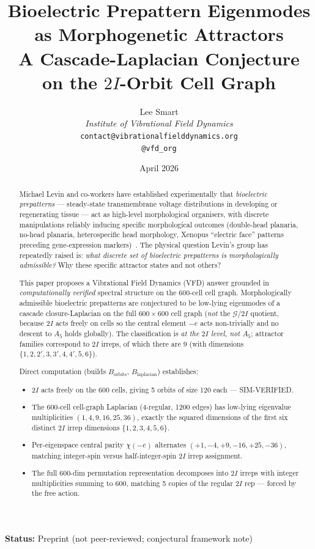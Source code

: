 \documentclass[12pt]{article}
\title{Bioelectric Prepattern Eigenmodes as Morphogenetic Attractors\\[6pt]
\large A Cascade-Laplacian Conjecture on the $2I$-Orbit Cell Graph}
\author{%
  Lee Smart\\[4pt]
  \textit{Institute of Vibrational Field Dynamics}\\[2pt]
  \texttt{contact@vibrationalfielddynamics.org}\\[2pt]
  \texttt{@vfd\_org}%
}
\date{April 2026}
\begin{document}
\maketitle

\noindent\textbf{Status:} Preprint (not peer-reviewed;
conjectural framework note)

\begin{abstract}
Michael Levin and co-workers have established experimentally that
\emph{bioelectric prepatterns} --- steady-state transmembrane
voltage distributions in developing or regenerating tissue ---
act as high-level morphological organisers, with discrete
manipulations reliably inducing specific morphological outcomes
(double-head planaria, no-head planaria, heterospecific head
morphology, Xenopus ``electric face'' patterns preceding
gene-expression
markers)~\cite{LevinBeane2011,DurantLevin2017,PietakLevin2016,Levin2021}.
The physical question Levin's group has repeatedly raised is:
\emph{what discrete set of bioelectric prepatterns is
morphologically admissible?} Why these specific attractor states
and not others?

This paper proposes a Vibrational Field Dynamics (VFD)
answer grounded in \emph{computationally verified} spectral
structure on the 600-cell cell graph. Morphologically admissible
bioelectric prepatterns are conjectured to be low-lying eigenmodes
of a cascade closure-Laplacian on the full $600 \times 600$ cell
graph (\emph{not} the $\mathcal{G}/2I$ quotient, because $2I$
acts freely on cells so the central element $-e$ acts
non-trivially and no descent to $A_5$ holds globally). The
classification is \emph{at the $2I$ level, not $A_5$}; attractor
families correspond to $2I$ irreps, of which there are 9 (with
dimensions $\{1, 2, 2', 3, 3', 4, 4', 5, 6\}$).

Direct computation (builds $B_{\mathrm{orbits}}$,
$B_{\mathrm{laplacian}}$) establishes:
\begin{itemize}
\item $2I$ acts freely on the 600 cells, giving 5 orbits of size
  120 each — SIM-VERIFIED.
\item The 600-cell cell-graph Laplacian (4-regular, 1200 edges)
  has low-lying eigenvalue multiplicities
  $(1, 4, 9, 16, 25, 36)$, exactly the squared dimensions
  of the first six distinct $2I$ irrep dimensions
  $\{1, 2, 3, 4, 5, 6\}$.
\item Per-eigenspace central parity $\chi(-e)$ alternates
  $(+1, -4, +9, -16, +25, -36)$, matching integer-spin versus
  half-integer-spin $2I$ irrep assignment.
\item The full 600-dim permutation representation decomposes
  into $2I$ irreps with integer multiplicities summing to 600,
  matching 5 copies of the regular $2I$ rep — forced by the
  free action.
\end{itemize}


\end{abstract}
\end{document}
